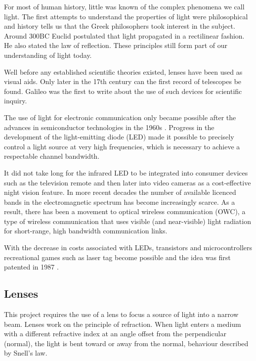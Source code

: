 For most of human history, little was known of the complex phenomena we call light. The first attempts to understand the properties of light were philosophical and history tells us that the Greek philosophers took interest in the subject. Around 300BC Euclid postulated that light propagated in a rectilinear fashion. He also stated the law of reflection. These principles still form part of our understanding of light today. \cite{Vohnsen2004}

Well before any established scientific theories existed, lenses have been used as visual aids. Only later in the 17th century can the first record of telescopes be found. Galileo was the first to write about the use of such devices for scientific inquiry.

The use of light for electronic communication only became possible after the advances in semiconductor technologies in the 1960s \cite{Huurdeman2003}. Progress in the development of the light-emitting diode (LED) made it possible to precisely control a light source at very high frequencies, which is necessary to achieve a respectable channel bandwidth.

It did not take long for the infrared LED to be integrated into consumer devices such as the television remote and then later into video cameras as a cost-effective night vision feature. In more recent decades the number of available licenced bands in the electromagnetic spectrum has become increasingly scarce. As a result, there has been a movement to optical wireless communication (OWC), a type of wireless communication that uses visible (and near-visible) light radiation for short-range, high bandwidth communication links.

With the decrease in costs associated with LEDs, transistors and microcontrollers recreational games such as laser tag become possible and the idea was first patented in 1987 \cite{Carter1986}.



\subsection{Lenses}
\label{sec:lit_lenses}
This project requires the use of a lens to focus a source of light into a narrow beam. Lenses work on the principle of refraction. When light enters a medium with a different refractive index at an angle offset from the perpendicular (normal), the light is bent toward or away from the normal, behaviour described by Snell's law.

